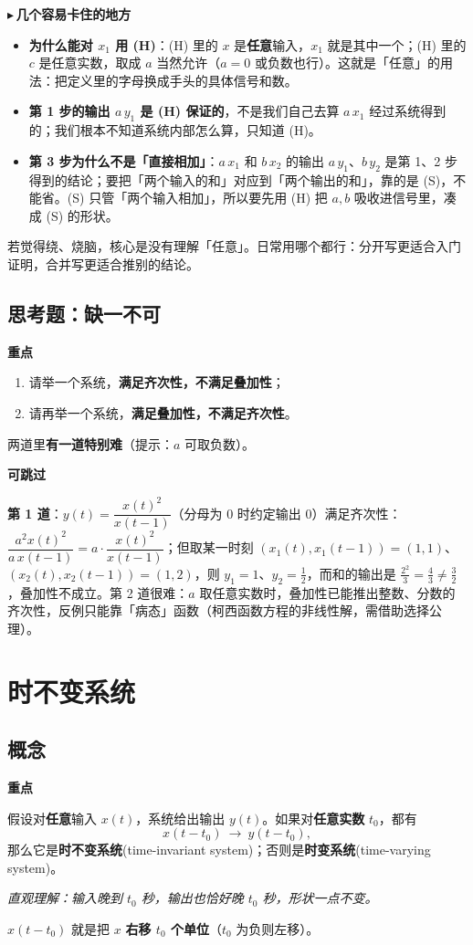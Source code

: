 \documentclass[UTF8,a4paper,11pt]{ctexart}
\newenvironment{remember}{\begin{rememberbox}\textbf{重点}\par\smallskip}{\end{rememberbox}}
\newenvironment{skippable}{\begin{skipbox}\textbf{可跳过}\par\smallskip}{\end{skipbox}}
\newcounter{ex}[section]
\newcommand{\point}[1]{\par\addvspace{1ex}\noindent\textcolor{ptteal}{$\blacktriangleright$\,\textbf{#1}}\ }
\begin{document}
\point{几个容易卡住的地方}
\begin{itemize}[nosep]
\item \textbf{为什么能对 $x_1$ 用 (H)}：(H) 里的 $x$ 是\textbf{任意}输入，$x_1$ 就是其中一个；(H) 里的 $c$ 是任意实数，取成 $a$ 当然允许（$a=0$ 或负数也行）。这就是「任意」的用法：把定义里的字母换成手头的具体信号和数。
\item \textbf{第 1 步的输出 $a\,y_1$ 是 (H) 保证的}，不是我们自己去算 $a\,x_1$ 经过系统得到的；我们根本不知道系统内部怎么算，只知道 (H)。
\item \textbf{第 3 步为什么不是「直接相加」}：$a\,x_1$ 和 $b\,x_2$ 的输出 $a\,y_1$、$b\,y_2$ 是第 1、2 步得到的结论；要把「两个输入的和」对应到「两个输出的和」，靠的是 (S)，不能省。(S) 只管「两个输入相加」，所以要先用 (H) 把 $a,b$ 吸收进信号里，凑成 (S) 的形状。
\end{itemize}
若觉得绕、烧脑，核心是没有理解「任意」。日常用哪个都行：分开写更适合入门证明，合并写更适合推别的结论。

\subsection{思考题：缺一不可}
\begin{remember}
\begin{enumerate}[nosep]
\item 请举一个系统，\textbf{满足齐次性，不满足叠加性}；
\item 请再举一个系统，\textbf{满足叠加性，不满足齐次性}。
\end{enumerate}
\end{remember}
两道里\textbf{有一道特别难}（提示：$a$ 可取负数）。

\begin{skippable}
\textbf{第 1 道}：$y(t)=\dfrac{x(t)^2}{x(t-1)}$（分母为 $0$ 时约定输出 $0$）满足齐次性：$\dfrac{a^2x(t)^2}{a\,x(t-1)}=a\cdot\dfrac{x(t)^2}{x(t-1)}$；但取某一时刻 $(x_1(t),x_1(t-1))=(1,1)$、$(x_2(t),x_2(t-1))=(1,2)$，则 $y_1=1$、$y_2=\tfrac12$，而和的输出是 $\tfrac{2^2}{3}=\tfrac43\neq\tfrac32$，叠加性不成立。第 2 道很难：$a$ 取任意实数时，叠加性已能推出整数、分数的齐次性，反例只能靠「病态」函数（柯西函数方程的非线性解，需借助选择公理）。
\end{skippable}

\section{时不变系统}
\subsection{概念}
\begin{remember}
假设对\textbf{任意}输入 $x(t)$，系统给出输出 $y(t)$。如果对\textbf{任意实数} $t_0$，都有
\[
x(t-t_0)\ \to\ y(t-t_0),
\]
那么它是\textbf{时不变系统}(time-invariant system)；否则是\textbf{时变系统}(time-varying system)。

\emph{直观理解：输入晚到 $t_0$ 秒，输出也恰好晚 $t_0$ 秒，形状一点不变。}
\end{remember}
$x(t-t_0)$ 就是把 $x$ \textbf{右移 $t_0$ 个单位}（$t_0$ 为负则左移）。
\end{document}
